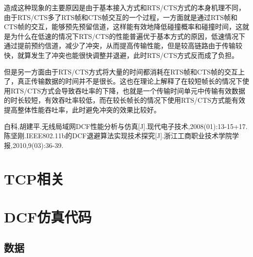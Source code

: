 \documentclass{article}
\begin{document}
造成这种现象的主要原因是由于基本接入方式和RTS/CTS方式的本身机理不同，由于RTS/CTS多了RTS帧和CTS帧交互的一个过程，一方面就是通过RTS帧和CTS帧的交互，能够预先预留信道，这样能有效地降低碰撞概率和碰撞时间，这就是为什么在低速的情况下RTS/CTS的性能普遍优于基本方式的原因，低速情况下通过提前预约信道，减少了冲突，从而提高传输性能，但是较高链路由于传输较快，就算发生了冲突也能很快调整并退避，此时RTS/CTS方式反而成了负担。

但是另一方面由于RTS/CTS方式将大量的时间都消耗在RTS帧和CTS帧的交互上了，真正传输数据的时间并不是很长。这也在理论上解释了在较短帧长的情况下使用RTS/CTS方式会导致吞吐率的下降，也就是一个传输时间单元中传输有效数据的时长较短，有效吞吐率较低，而在较长帧长的情况下使用RTS/CTS方式能有效提高整体性能吞吐率，此时避免冲突的效果比较好。

\begin{thebibliography}{99}
	 白科,胡建平.无线局域网DCF性能分析与仿真[J].现代电子技术,2008(01):13-15+17.
	 陈坚刚.IEEE802.11b的DCF退避算法实现技术探究[J].浙江工商职业技术学院学报,2010,9(03):36-39.
\end{thebibliography}

\appendix
\section{TCP相关}
\section{DCF仿真代码}
\subsection{数据}
\end{document}
